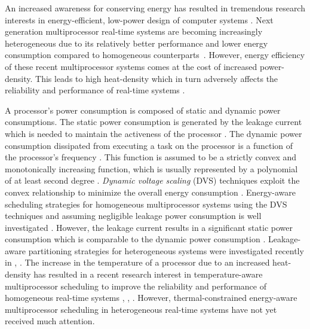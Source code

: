 \documentclass[conference]{IEEEtran}
\begin{document}
An increased awareness for conserving energy has resulted in tremendous research interests in energy-efficient, %
low-power design of computer systems \cite{Chen09}.
Next generation multiprocessor real-time systems are becoming
increasingly heterogeneous due to its relatively better performance and lower energy consumption compared to homogeneous counterparts~\cite{Kumar06}.
However, energy efficiency of these recent multiprocessor systems comes at the cost of increased power-density.
This leads to  high heat-density which  in turn adversely affects the reliability and
performance of real-time systems \cite{Wang10}.


A processor's power consumption is composed of static and dynamic power consumptions. The static power consumption is
generated by the leakage current which is needed to maintain the activeness of the processor \cite{Chen09}. The dynamic power
consumption dissipated from executing a task on the processor
is a function of the processor's frequency \cite{Aydin03}. This function is assumed to be a strictly convex and monotonically increasing function,
which is usually represented by a polynomial of at least second degree \cite{Chen05}.
\emph{Dynamic voltage scaling} (DVS) techniques exploit the convex relationship to minimize the overall energy consumption \cite{Hong98}.
Energy-aware scheduling strategies for homogeneous multiprocessor systems using the DVS techniques and assuming negligible
leakage power consumption is well investigated  \cite{Chen07}. %
However, the leakage current results in a significant static power consumption which is comparable to the dynamic power consumption \cite{Langen06}.
Leakage-aware partitioning strategies for heterogeneous systems were investigated recently in \cite{Chen09}, \cite{Langen09}.
The increase in the temperature of a processor due to an increased heat-density
has resulted in a recent
research interest in temperature-aware multiprocessor scheduling
to improve the reliability and performance of homogeneous real-time systems \cite{Chantem10}, \cite{Quan10}, \cite{Fisher09}.
However, thermal-constrained energy-aware multiprocessor scheduling in heterogeneous real-time systems have not yet received much attention.
\end{document}
